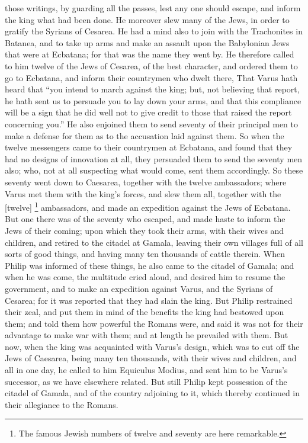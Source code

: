 those writings, by guarding all the passes, lest any one should escape,
and inform the king what had been done. He moreover slew many of the Jews,
in order to gratify the Syrians of Cesarea. He had a mind also to join
with the Trachonites in Batanea, and to take up arms and make an assault
upon the Babylonian Jews that were at Ecbatana; for that was the name they
went by. He therefore called to him twelve of the Jews of Cesarea, of the
best character, and ordered them to go to Ecbatana, and inform their
countrymen who dwelt there, That Varus hath heard that ``you intend to
march against the king; but, not believing that report, he hath sent us to
persuade you to lay down your arms, and that this compliance will be a
sign that he did well not to give credit to those that raised the report
concerning you.'' He also enjoined them to send seventy of their principal
men to make a defense for them as to the accusation laid against them. So
when the twelve messengers came to their countrymen at Ecbatana, and found
that they had no designs of innovation at all, they persuaded them to send
the seventy men also; who, not at all suspecting what would come, sent
them accordingly. So these seventy went down to Caesarea, together with
the twelve ambassadors; where Varus met them with the king's forces, and
slew them all, together with the [twelve] \footnote{The famous Jewish numbers
of twelve and seventy are here remarkable.} ambassadors,
and made an expedition against the Jews of Ecbatana. But one there was of
the seventy who escaped, and made haste to inform the Jews of their
coming; upon which they took their arms, with their wives and children,
and retired to the citadel at Gamala, leaving their own villages full of
all sorts of good things, and having many ten thousands of cattle therein.
When Philip was informed of these things, he also came to the citadel of
Gamala; and when he was come, the multitude cried aloud, and desired him
to resume the government, and to make an expedition against Varus, and the
Syrians of Cesarea; for it was reported that they had slain the king. But
Philip restrained their zeal, and put them in mind of the benefits the
king had bestowed upon them; and told them how powerful the Romans were,
and said it was not for their advantage to make war with them; and at
length he prevailed with them. But now, when the king was acquainted with
Varus's design, which was to cut off the Jews of Caesarea, being many ten
thousands, with their wives and children, and all in one day, he called to
him Equiculus Modius, and sent him to be Varus's successor, as we have
elsewhere related. But still Philip kept possession of the citadel of
Gamala, and of the country adjoining to it, which thereby continued in
their allegiance to the Romans.

